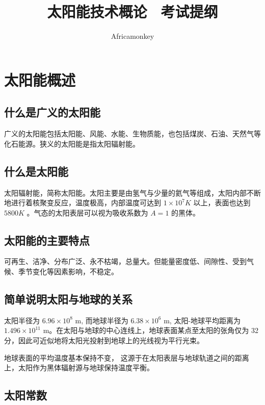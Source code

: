 \documentclass{article}
\begin{document}
\title{太阳能技术概论 \ 考试提纲}
\author {Africamonkey}
\maketitle

\section{太阳能概述}

\subsection{什么是广义的太阳能}

广义的太阳能包括太阳能、风能、水能、生物质能，也包括煤炭、石油、天然气等化石能源。狭义的太阳能是指太阳辐射能。

\subsection{什么是太阳能}

太阳辐射能，简称太阳能。太阳主要是由氢气与少量的氦气等组成，太阳内部不断地进行着核聚变反应，温度极高，内部温度可达到 $1 \times 10^7 K$ 以上，表面也达到 $5800 K$ 。气态的太阳表层可以视为吸收系数为 $A=1$ 的黑体。

\subsection{太阳能的主要特点}

可再生、洁净、分布广泛、永不枯竭，总量大。但能量密度低、间隙性、受到气候、季节变化等因素影响，不稳定。

\subsection{简单说明太阳与地球的关系}

太阳半径为 $6.96 \times 10^8$ m, 而地球半径为 $6.38 \times 10^6$ m, 太阳-地球平均距离为 $1.496 \times 10^{11}$ m。在太阳与地球的中心连线上，地球表面某点至太阳的张角仅为 32 分，因此可近似地将太阳光投射到地球上的光线视为平行光束。

地球表面的平均温度基本保持不变， 这源于在太阳表层与地球轨道之间的距离上，太阳作为黑体辐射源与地球保持温度平衡。

\subsection{太阳常数}
\end{document}
